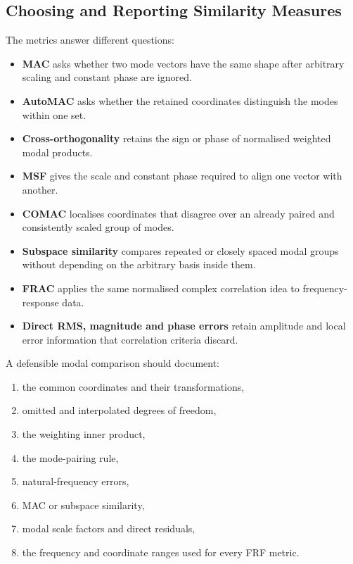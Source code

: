 \subsection{Choosing and Reporting Similarity Measures}

The metrics answer different questions:

\begin{itemize}
    \item \textbf{MAC} asks whether two mode vectors have the same shape after
          arbitrary scaling and constant phase are ignored.
    \item \textbf{AutoMAC} asks whether the retained coordinates distinguish
          the modes within one set.
    \item \textbf{Cross-orthogonality} retains the sign or phase of
          normalised weighted modal products.
    \item \textbf{MSF} gives the scale and constant phase required to align one
          vector with another.
    \item \textbf{COMAC} localises coordinates that disagree over an already
          paired and consistently scaled group of modes.
    \item \textbf{Subspace similarity} compares repeated or closely spaced
          modal groups without depending on the arbitrary basis inside them.
    \item \textbf{FRAC} applies the same normalised complex correlation idea to
          frequency-response data.
    \item \textbf{Direct RMS, magnitude and phase errors} retain amplitude and
          local error information that correlation criteria discard.
\end{itemize}

A defensible modal comparison should document:

\begin{enumerate}
    \item the common coordinates and their transformations,
    \item omitted and interpolated degrees of freedom,
    \item the weighting inner product,
    \item the mode-pairing rule,
    \item natural-frequency errors,
    \item MAC or subspace similarity,
    \item modal scale factors and direct residuals,
    \item the frequency and coordinate ranges used for every FRF metric.
\end{enumerate}

